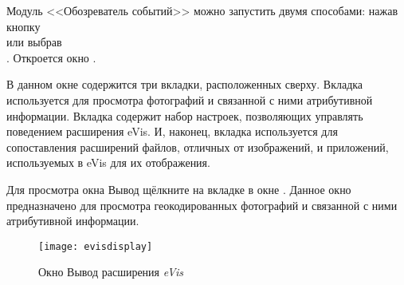 \label{evis_launch_browser}

Модуль <<Обозреватель событий>> можно запустить двумя способами:
нажав кнопку \\
 или
выбрав  \arrow {} \arrow \\
. Откроется окно .

В данном окне содержится три вкладки, расположенных сверху. Вкладка 
используется для просмотра фотографий и связанной с ними атрибутивной
информации. Вкладка  содержит набор настроек, позволяющих
управлять поведением расширения eVis. И, наконец, вкладка 
используется для сопоставления расширений файлов, отличных от изображений,
и приложений, используемых в eVis для их отображения.

\label{evis_display_window}

Для просмотра окна Вывод щёлкните на вкладке  в
окне . Данное окно предназначено для просмотра
геокодированных фотографий и связанной с ними атрибутивной информации.

\begin{figure}[ht]
   \centering
   \texttt{[image: evisdisplay]}
   \caption{Окно Вывод расширения \emph{eVis} \wincaption}\label{evisdisplay}
\end{figure}

